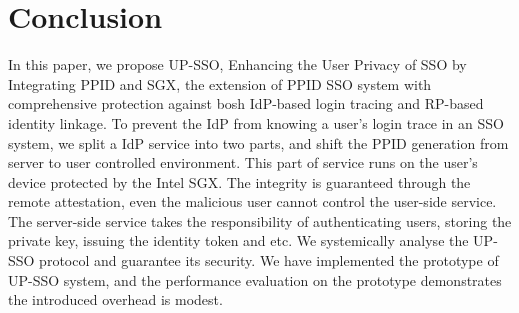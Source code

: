 \section{Conclusion}
\label{sec:conclusion}
In this paper, we propose UP-SSO, Enhancing the User Privacy of SSO by Integrating PPID and SGX, the extension of PPID SSO system with comprehensive protection against bosh IdP-based login tracing and RP-based identity linkage. To prevent the IdP from knowing a user's login trace in an SSO system, we split a IdP service into two parts, and shift the PPID generation from server to user controlled environment.
This part of service runs on the user's device protected by the Intel SGX. The integrity is guaranteed through the remote attestation, even the malicious user cannot control the user-side service. The server-side service takes the responsibility of authenticating users, storing the private key, issuing the identity token and etc. 
We systemically analyse the UP-SSO protocol and guarantee its security. 
We have implemented the prototype of UP-SSO system, and the performance evaluation on the prototype demonstrates the introduced overhead is modest. 
